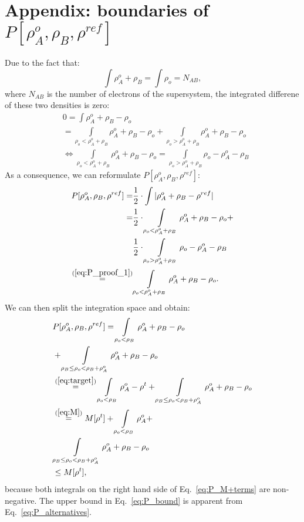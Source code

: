 \documentclass[journal=jctcce,manuscript=article, layout=twocolumn]{achemso}
\begin{document}
\section{Appendix: boundaries of $P[\rho^{o}_A, \rho_B, \rho^{ref}]$}
Due to the fact that:
\begin{equation}
 \int \rho^{o}_A + \rho_B = \int \rho_o = N_{AB},
\end{equation}
where $N_{AB}$ is the number of electrons of the supersystem, the integrated differene of these two densities is zero:
\begin{align}\label{eq:P_proof_1} \nonumber
 & 0 = \int \rho^{o}_A + \rho_B - \rho_o \\ \nonumber
 & = \int\limits_{\rho_o <\rho^{o}_A + \rho_B}\rho^{o}_A + \rho_B - \rho_o + \int\limits_{\rho_o > \rho^{o}_A + \rho_B}\rho^{o}_A + \rho_B - \rho_o \\ 
 & \Leftrightarrow \int\limits_{\rho_o < \rho^{o}_A + \rho_B}\rho^{o}_A + \rho_B - \rho_o = \int\limits_{\rho_o > \rho^{o}_A + \rho_B}\rho_o - \rho^{o}_A - \rho_B 
\end{align}
As a consequence, we can reformulate $P[\rho^{o}_A, \rho_B, \rho^{ref}]$:
\begin{align}\label{eq:P_alternatives} \nonumber
P[\rho^{o}_A, \rho_B, \rho^{ref}] = & \frac{1}{2} \cdot \int \vert \rho^{o}_A + \rho_B - \rho^{ref} \vert \\ \nonumber
= & \frac{1}{2} \cdot \int\limits_{\rho_o <\rho^{o}_A + \rho_B}\rho^{o}_A + \rho_B - \rho_o + \\ \nonumber
 & \frac{1}{2} \cdot \int\limits_{\rho_o > \rho^{o}_A + \rho_B} \rho_o - \rho^{o}_A - \rho_B  \\ 
 \overset{(\ref{eq:P_proof_1})}{=} & \int\limits_{\rho_o <\rho^{o}_A + \rho_B}\rho^{o}_A + \rho_B - \rho_o.
\end{align}
We can then split the integration space and obtain:
\begin{align}\label{eq:P_M+terms} \nonumber
& P[\rho^{o}_A, \rho_B, \rho^{ref}] = \int\limits_{\rho_o < \rho_B}\rho^{o}_A + \rho_B - \rho_o \\ \nonumber
 & + \int\limits_{\rho_B \leq \rho_o < \rho_B + \rho^{o}_A}\rho^{o}_A + \rho_B - \rho_o \\ \nonumber
 & \overset{(\ref{eq:target})}{=} \int\limits_{\rho_o < \rho_B}\rho^{o}_A - \rho^t + \int\limits_{\rho_B \leq \rho_o < \rho_B + \rho^{o}_A}\rho^{o}_A + \rho_B - \rho_o \\ \nonumber
 & \overset{(\ref{eq:M})}{=}  M[\rho^t] + \int\limits_{\rho_o < \rho_B}\rho^{o}_A + \\
 & \int\limits_{\rho_B \leq \rho_o < \rho_B + \rho^{o}_A}\rho^{o}_A + \rho_B - \rho_o \\ \nonumber
 & \leq M[\rho^t], 
\end{align}
because both integrals on the right hand side of Eq.~\ref{eq:P_M+terms} are non-negative.
The upper bound in Eq.~\ref{eq:P_bound} is apparent from Eq.~\ref{eq:P_alternatives}.
\end{document}
